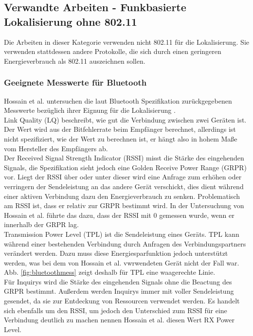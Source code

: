 \subsection{Verwandte Arbeiten - Funkbasierte Lokalisierung ohne 802.11}
Die Arbeiten in dieser Kategorie verwenden nicht 802.11 für die Lokalisierung.
Sie verwenden stattdessen andere Protokolle, die sich durch einen geringeren Energieverbrauch als 802.11 auszeichnen sollen.

\subsubsection{Geeignete Messwerte für Bluetooth}
Hossain et al. untersuchen die laut Bluetooth Spezifikation zurückgegebenen Messwerte bezüglich ihrer Eignung für die Lokalisierung \cite{hossain2007comprehensive}.\\ 
Link Quality (LQ) beschreibt, wie gut die Verbindung zwischen zwei Geräten ist.
Der Wert wird aus der Bitfehlerrate beim Empfänger berechnet, allerdings ist nicht spezifiziert, wie der Wert zu berechnen ist, er hängt also in hohem Maße vom Hersteller des Empfängers ab. \\
Der Received Signal Strength Indicator (RSSI) misst die Stärke des eingehenden Signals, die Spezifikation sieht jedoch eine Golden Receive Power Range (GRPR) vor. 
Liegt der RSSI über oder unter dieser wird eine Anfrage zum erhöhen oder verringern der Sendeleistung an das andere Gerät verschickt, dies dient während einer aktiven Verbindung dazu den Energieverbrauch zu senken.
Problematisch am RSSI ist, dass er relativ zur GRPR bestimmt wird.
In der Untersuchung von Hossain et al. führte das dazu, dass der RSSI mit 0 gemessen wurde, wenn er innerhalb der GRPR lag. \\
Transmission Power Level (TPL) ist die Sendeleistung eines Geräts. 
TPL kann während einer bestehenden Verbindung durch Anfragen des Verbindungspartners verändert werden.
Dazu muss diese Energiesparfunktion jedoch unterstützt werden, was bei dem von Hossain et al. vwrwendeten Gerät nicht der Fall war.
Abb. \ref{fig:bluetoothmess} zeigt deshalb für TPL eine waagerechte Linie.\\
Für Inquirys wird die Stärke des eingehenden Signals ohne die Beactung des GRPR bestimmt.
Außerdem werden Inquirys immer mit voller Sendeleistung gesendet, da sie zur Entdeckung von Ressourcen verwendet werden.
Es handelt sich ebenfalls um den RSSI, um jedoch den Unterschied zum RSSI für eine Verbindung deutlich zu machen nennen Hossain et al. diesen Wert RX Power Level.

